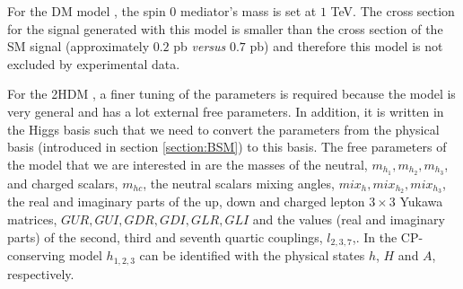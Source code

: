 
For the DM model \cite{DM}, the spin 0 mediator's mass is set at $1$ TeV. The cross section for the signal generated with this model is smaller than the cross section of the SM signal (approximately $0.2$ pb \textit{versus} $0.7$ pb) and therefore this model is not excluded by experimental data.

For the 2HDM \cite{2HDM,2HDM1}, a finer tuning of the parameters is required because the model is very general and has a lot external free parameters. In addition, it is written in the Higgs basis such that we need to convert the parameters from the physical basis (introduced in section \ref{section:BSM}) to this basis. The free parameters of the model that we are interested in are the masses of the neutral, $m_{h_1}, m_{h_2}, m_{h_3}$, and charged scalars, $m_{hc}$, the neutral scalars mixing angles, $mix_h, mix_{h_2}, mix_{h_3}$, the real and imaginary parts of the up, down and charged lepton $3\times 3$ Yukawa matrices, $GUR, GUI, GDR, GDI, GLR, GLI$ and the values (real and imaginary parts) of the second, third and seventh quartic couplings, $l_{2,3,7}$,. In the CP-conserving model $h_{1,2,3}$ can be identified with the physical states $h$, $H$ and $A$, respectively.

